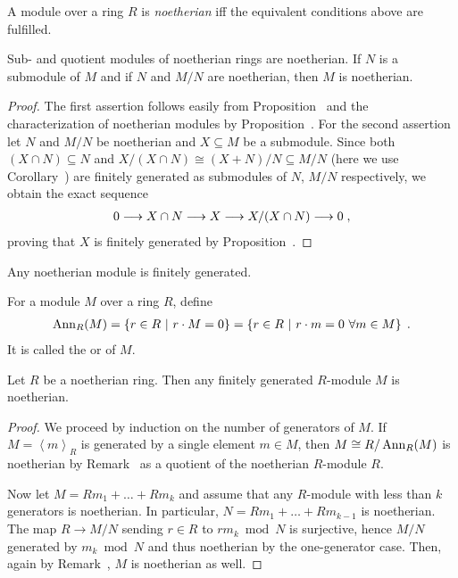 \documentclass[a4paper,parskip=half,numbers=enddot, DIV=12]{scrreprt}
\begin{document}
	\begin{defi}
		A module over a ring $R$ is \emph{noetherian} iff the equivalent conditions above are fulfilled.
	\end{defi}
	\begin{rem}
		Sub- and quotient modules of noetherian rings are noetherian. If $N$ is a submodule of $M$ and if $N$ and $M/N$ are noetherian, then $M$ is noetherian.
	\end{rem}
	\begin{proof}
		The first assertion follows easily from Proposition~ and the characterization of noetherian modules by Proposition~. For the second assertion let $N$ and $M/N$ be noetherian and $X\subseteq M$ be a submodule. Since both $(X\cap N)\subseteq N$ and $X/(X\cap N)\cong(X+N)/N\subseteq M/N$ (here we use Corollary~) are finitely generated as submodules of $N$, $M/N$ respectively, we obtain the exact sequence 
		\begin{align*}
		0\longrightarrow X\cap N\longrightarrow X\longrightarrow X/(X\cap N)\longrightarrow 0\;,
		\end{align*}
		proving that $X$ is finitely generated by Proposition~. 
	\end{proof}
	\begin{rem}
		Any noetherian module is finitely generated.
	\end{rem}
	\begin{defi}
		For a module $M$ over a ring $R$, define 
		\begin{align*}
		\operatorname{Ann}_R(M)=\left\{r\in R\ \middle|\  r\cdot M = 0\right\} = \left\{r\in R\ \middle|\  r\cdot m = 0\ \forall m\in M\right\}\;.
		\end{align*}
		It is called the  or  of $M$.
	\end{defi}
	\begin{prop}
		Let $R$ be a noetherian ring. Then any finitely generated $R$-module $M$ is noetherian.
	\end{prop}
	\begin{proof}
		We proceed by induction on the number of generators of $M$. If $M=\left\langle m\right\rangle_R$ is generated by a single element $m\in M$, then $M\cong R/\operatorname{Ann}_R(M)$ is noetherian by Remark~ as a quotient of the noetherian $R$-module $R$. 
		
		Now let $M=Rm_1+\ldots+Rm_k$ and assume that any $R$-module with less than $k$ generators is noetherian. In particular, $N=Rm_1+\ldots+Rm_{k-1}$ is noetherian. The map $R\to M/N$ sending $r\in R$ to $rm_k\bmod N$ is surjective, hence $M/N$ generated by $m_k\bmod N$ and thus noetherian by the one-generator case. Then, again by Remark~, $M$ is noetherian as well.
	\end{proof}
\end{document}
